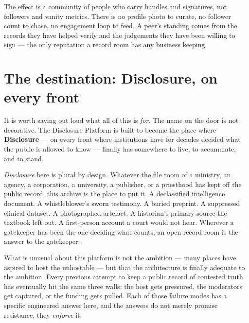 \documentclass[11pt,a4paper]{article}
\begin{document}
The effect is a community of people who carry handles and signatures, not
followers and vanity metrics. There is no profile photo to curate, no
follower count to chase, no engagement loop to feed. A peer's standing comes
from the records they have helped verify and the judgements they have been
willing to sign --- the only reputation a record room has any business
keeping.

\section{The destination: Disclosure, on every front}

It is worth saying out loud what all of this is \emph{for}. The name on
the door is not decorative. The Disclosure Platform is built to become
the place where \textbf{Disclosure} --- on every front where institutions
have for decades decided what the public is allowed to know --- finally
has somewhere to live, to accumulate, and to stand.

\emph{Disclosure} here is plural by design. Whatever the file room of a
ministry, an agency, a corporation, a university, a publisher, or a
priesthood has kept off the public record, this archive is the place to
put it. A declassified intelligence document. A whistleblower's sworn
testimony. A buried preprint. A suppressed clinical dataset. A
photographed artefact. A historian's primary source the textbook left
out. A first-person account a court would not hear. Wherever a
gatekeeper has been the one deciding what counts, an open record room
is the answer to the gatekeeper.

What is unusual about this platform is not the ambition --- many places
have aspired to host the unhostable --- but that the architecture is
finally adequate to the ambition. Every previous attempt to keep a
public record of contested truth has eventually hit the same three
walls: the host gets pressured, the moderators get captured, or the
funding gets pulled. Each of those failure modes has a specific
engineered answer here, and the answers do not merely promise
resistance, they \emph{enforce} it.
\end{document}
